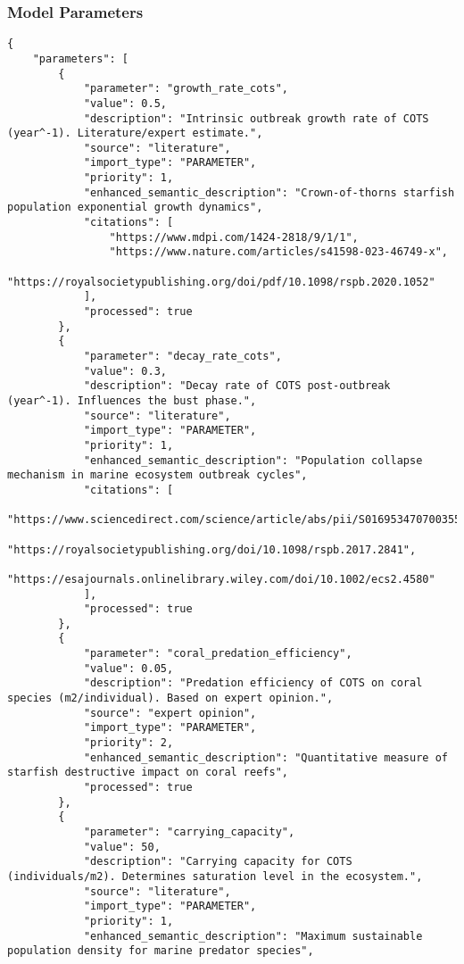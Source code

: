 \subsubsection{Model Parameters}
\begin{lstlisting}
{
    "parameters": [
        {
            "parameter": "growth_rate_cots",
            "value": 0.5,
            "description": "Intrinsic outbreak growth rate of COTS (year^-1). Literature/expert estimate.",
            "source": "literature",
            "import_type": "PARAMETER",
            "priority": 1,
            "enhanced_semantic_description": "Crown-of-thorns starfish population exponential growth dynamics",
            "citations": [
                "https://www.mdpi.com/1424-2818/9/1/1",
                "https://www.nature.com/articles/s41598-023-46749-x",
                "https://royalsocietypublishing.org/doi/pdf/10.1098/rspb.2020.1052"
            ],
            "processed": true
        },
        {
            "parameter": "decay_rate_cots",
            "value": 0.3,
            "description": "Decay rate of COTS post-outbreak (year^-1). Influences the bust phase.",
            "source": "literature",
            "import_type": "PARAMETER",
            "priority": 1,
            "enhanced_semantic_description": "Population collapse mechanism in marine ecosystem outbreak cycles",
            "citations": [
                "https://www.sciencedirect.com/science/article/abs/pii/S0169534707003552",
                "https://royalsocietypublishing.org/doi/10.1098/rspb.2017.2841",
                "https://esajournals.onlinelibrary.wiley.com/doi/10.1002/ecs2.4580"
            ],
            "processed": true
        },
        {
            "parameter": "coral_predation_efficiency",
            "value": 0.05,
            "description": "Predation efficiency of COTS on coral species (m2/individual). Based on expert opinion.",
            "source": "expert opinion",
            "import_type": "PARAMETER",
            "priority": 2,
            "enhanced_semantic_description": "Quantitative measure of starfish destructive impact on coral reefs",
            "processed": true
        },
        {
            "parameter": "carrying_capacity",
            "value": 50,
            "description": "Carrying capacity for COTS (individuals/m2). Determines saturation level in the ecosystem.",
            "source": "literature",
            "import_type": "PARAMETER",
            "priority": 1,
            "enhanced_semantic_description": "Maximum sustainable population density for marine predator species",

\end{lstlisting}
